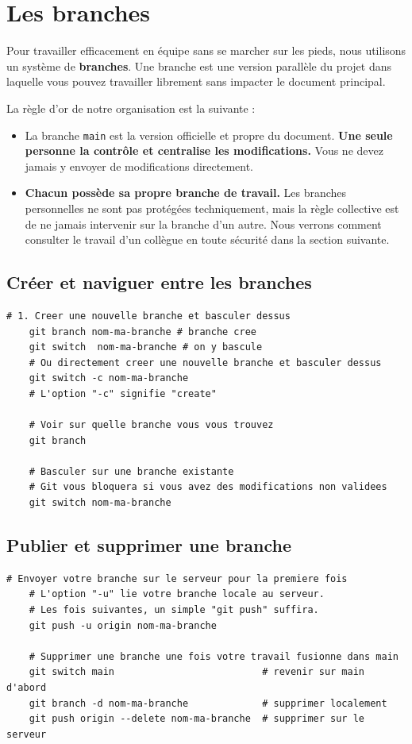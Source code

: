 \documentclass[11pt,a4paper]{article}
\begin{document}
\section{Les branches}

Pour travailler efficacement en équipe sans se marcher sur les pieds, 
nous utilisons un système de \textbf{branches}. Une branche est une 
version parallèle du projet dans laquelle vous pouvez travailler 
librement sans impacter le document principal.

La règle d'or de notre organisation est la suivante :
\begin{itemize}
	\item La branche \texttt{main} est la version officielle et propre 
	du document. \textbf{Une seule personne la contrôle et centralise 
		les modifications.} Vous ne devez jamais y envoyer de modifications 
	directement.
	\item \textbf{Chacun possède sa propre branche de travail.} 
	Les branches personnelles ne sont pas protégées techniquement, 
	mais la règle collective est de ne jamais intervenir sur la branche 
	d'un autre. Nous verrons comment consulter le travail d'un collègue 
	en toute sécurité dans la section suivante.
\end{itemize}

\subsection*{Créer et naviguer entre les branches}

\begin{lstlisting}[style=bashstyle]
	# 1. Creer une nouvelle branche et basculer dessus
	git branch nom-ma-branche # branche cree 
	git switch  nom-ma-branche # on y bascule
	# Ou directement creer une nouvelle branche et basculer dessus
	git switch -c nom-ma-branche
	# L'option "-c" signifie "create"
	
	# Voir sur quelle branche vous vous trouvez
	git branch
	
	# Basculer sur une branche existante
	# Git vous bloquera si vous avez des modifications non validees
	git switch nom-ma-branche
\end{lstlisting}

\subsection*{Publier et supprimer une branche}

\begin{lstlisting}[style=bashstyle]
	# Envoyer votre branche sur le serveur pour la premiere fois
	# L'option "-u" lie votre branche locale au serveur.
	# Les fois suivantes, un simple "git push" suffira.
	git push -u origin nom-ma-branche
	
	# Supprimer une branche une fois votre travail fusionne dans main
	git switch main                          # revenir sur main d'abord
	git branch -d nom-ma-branche             # supprimer localement
	git push origin --delete nom-ma-branche  # supprimer sur le serveur
\end{lstlisting}
\end{document}
